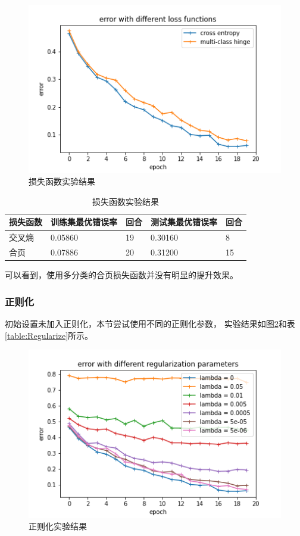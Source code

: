 \documentclass{article}
\begin{document}
\begin{figure}[p]
\includegraphics[width=\textwidth]
{Result/NN hinge/figure.png}
\caption{损失函数实验结果}
\label{fig:Loss}
\end{figure}

\begin{table}[h]
\centering
\begin{tabular}{|l|l|l|l|l|} 
\hline
损失函数 & 训练集最优错误率 & 回合 & 测试集最优错误率 & 回合 \\
\hline
交叉熵 & 0.05860 & 19 & 0.30160 & 8 \\
合页 & 0.07886 & 20 & 0.31200 & 15 \\
\hline
\end{tabular}
\caption{损失函数实验结果}
\label{table:Loss}
\end{table}

可以看到，使用多分类的合页损失函数并没有明显的提升效果。

\subsubsection{正则化}

初始设置未加入正则化，本节尝试使用不同的正则化参数，
实验结果如图\ref{fig:Regularize}和表\ref{table:Regularize}所示。

\begin{figure}[p]
\includegraphics[width=\textwidth]
{Result/NN regularize 5e-06/figure.png}
\caption{正则化实验结果}
\label{fig:Regularize}
\end{figure}
\end{document}
